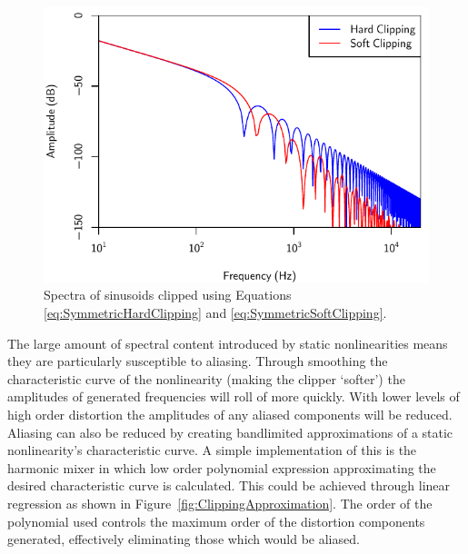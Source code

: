 			\begin{figure}[h!]
				\centering
				\includegraphics{chapter5/Images/ClippingSpectra.pdf}
				\caption{Spectra of sinusoids clipped using Equations \ref{eq:SymmetricHardClipping} and
			                 \ref{eq:SymmetricSoftClipping}.}
				\label{fig:ClippingSpectra}
			\end{figure}

			The large amount of spectral content introduced by static nonlinearities means they are
			particularly susceptible to aliasing. Through smoothing the characteristic curve of the
			nonlinearity (making the clipper `softer') the amplitudes of generated frequencies will roll of
			more quickly. With lower levels of high order distortion the amplitudes of any aliased components
			will be reduced. Aliasing can also be reduced by creating bandlimited approximations of a static
			nonlinearity's characteristic curve. A simple implementation of this is the harmonic mixer
			\citep{schattschneider1999discrete} in which low order polynomial expression approximating the
			desired characteristic curve is calculated.  This could be achieved through linear regression as
			shown in Figure~\ref{fig:ClippingApproximation}. The order of the polynomial used controls the
			maximum order of the distortion components generated, effectively eliminating those which would be
			aliased.

